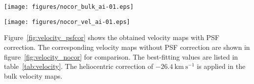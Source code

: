 \begin{figure*}
 \begin{minipage}{0.495\hsize}
  \centering
  \texttt{[image: figures/nocor\_bulk\_ai-01.eps]}
 \end{minipage}
 \begin{minipage}{0.495\hsize}
  \centering
  \texttt{[image: figures/nocor\_vel\_ai-01.eps]}
 \end{minipage}
 \caption{Same as figure~\ref{fig:velocity_psfcor}, but PSF correction is not applied.}\label{fig:velocity_nocor}
\end{figure*}

\begin{table*}
  \label{tab:velocity}
\end{table*}

Figure~\ref{fig:velocity_psfcor} shows the obtained velocity maps with PSF correction. The corresponding velocity maps without PSF correction are shown in figure~\ref{fig:velocity_nocor} for comparison. The best-fitting values are listed in table~\ref{tab:velocity}. The heliocentric correction of $-26.4~\mathrm{km~s^{-1}}$ is applied in the bulk velocity maps.

